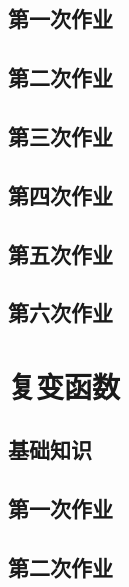 \documentclass[
	leqno, %
	a4paper, %
	fontsize=12pt, %
	twoside=false, %
	open=any, %
	chapterentrydots=true, %
	numbers=noenddot, %
    UTF-8, %
	toc=nottotoc,
	BCOR=12mm,
	DIV=calc,
]{styles/kaobook}
\begin{document}
\section{第一次作业}

\section{第二次作业}

\section{第三次作业}

\section{第四次作业}

\section{第五次作业}

\section{第六次作业}



\setchapterpreamble[u]{\margintoc}
\chapter{复变函数}
\section{基础知识}










\section{第一次作业}

\section{第二次作业}

\end{document}
